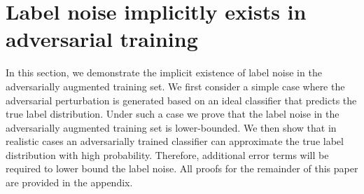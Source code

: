 \section{Label noise implicitly exists in adversarial training}
\label{sect:reason}
    
    In this section, we demonstrate the implicit existence of label noise in the adversarially augmented training set. We first consider a simple case where the adversarial perturbation is generated based on an ideal classifier that predicts the true label distribution. Under such a case we prove that the label noise in the adversarially augmented training set is lower-bounded. We then show that in realistic cases an adversarially trained classifier can approximate the true label distribution with high probability. Therefore, additional error terms will be required to lower bound the label noise.
    All proofs for the remainder of this paper are provided in the appendix.
    



